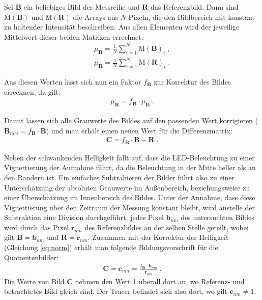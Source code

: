 Sei $\mathbf{B}$ ein beliebiges Bild der Messreihe und $\mathbf{R}$ das Referenzbild. Dann sind 
$\mathrm{M(\mathbf{B})}$ und $\mathrm{M(\mathbf{R})}$ die Arrays aus $N$ Pixeln, die den Bildbereich mit konstant zu haltender Intensität beschreiben. Aus allen Elementen 
wird der jeweilige Mittelwert dieser beiden Matrizen errechnet:
\begin{eqnarray}
 \mu_{\mathbf{B}} = \frac{1}{N} \sum_{i=1}^N \mathrm{M(\mathbf{B})}_i \; , \\
 \mu_{\mathbf{R}} = \frac{1}{N} \sum_{i=1}^N \mathrm{M(\mathbf{R})}_i \; .
\end{eqnarray}

Aus diesen Werten lässt sich nun ein Faktor $f_{\mathbf{B}}$ zur Korrektur des Bildes errechnen, da gilt:
\begin{eqnarray}
 \mu_{\mathbf{R}} = f_{\mathbf{B}} \cdot \mu_{\mathbf{B}} \; .
 \label{eq:norm}
\end{eqnarray}

Damit lassen sich alle Grauwerte des Bildes auf den passenden Wert korrigieren ($\mathbf{B}_{neu} = f_{\mathbf{B}} \cdot \mathbf{B}$) und man erhält einen neuen Wert für die 
Differenzmatrix:
\begin{eqnarray}
 \mathbf{C} = f_{\mathbf{B}} \cdot \mathbf{B} - \mathbf{R} \; .
\end{eqnarray}


Neben der schwankenden Helligkeit fällt auf, dass die LED-Beleuchtung zu einer Vignettierung der Aufnahme führt, da die Beleuchtung in der Mitte heller als an den Rändern ist. Ein einfaches Subtrahieren der Bilder führt also zu einer Unterschätzung der absoluten Grauwerte im Außenbereich, beziehungsweise zu einer Überschätzung im Innenbereich des Bildes.
Unter der Annahme, dass diese Vignettierung über den Zeitraum der Messung konstant bleibt, wird anstelle der Subtraktion eine Division durchgeführt, \dah jedes Pixel $\mathbf{b}_{nm}$ des untersuchten Bildes wird durch das Pixel $\mathbf{r}_{nm}$ des Referenzbildes an der selben Stelle geteilt, wobei gilt $\mathbf{B} = \mathbf{b}_{nm}$ und $\mathbf{R} = \mathbf{r}_{nm}$. Zusammen mit der Korrektur der Helligkeit (Gleichung \ref{eq:norm}) erhält man folgende Bildungsvorschrift für die Quotientenbilder:
\begin{eqnarray}
 \mathbf{C} = \mathbf{c}_{nm} = \frac{f_{\mathbf{B}} \cdot \mathbf{b}_{nm}}{\mathbf{r}_{nm}} \; .
 \label{eq:quot}
\end{eqnarray}
Die Werte von Bild $\mathbf{C}$ nehmen den Wert 1 überall dort an, wo Referenz- und betrachtetes Bild gleich sind. Der Tracer befindet sich also dort, wo gilt 
$\mathbf{c}_{nm} \neq 1$.

